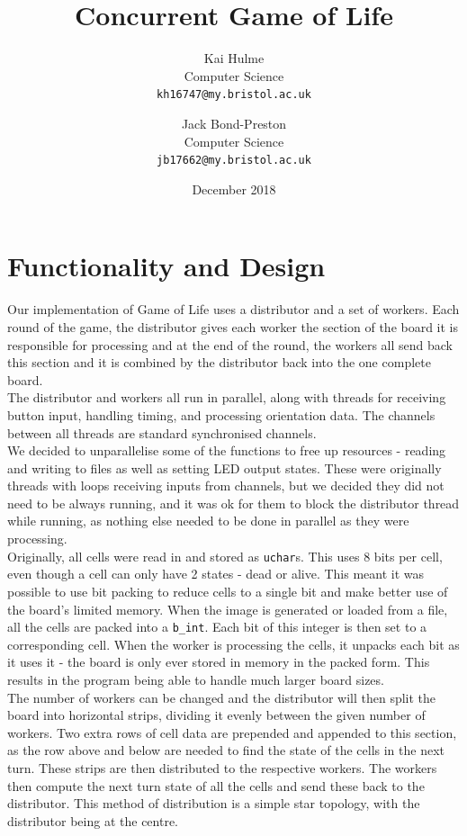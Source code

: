 \documentclass[]{article}
\title{Concurrent Game of Life}
\author{
	Kai Hulme\\
	Computer Science\\
	\texttt{kh16747@my.bristol.ac.uk}
	\and
	Jack Bond-Preston\\
	Computer Science\\
	\texttt{jb17662@my.bristol.ac.uk}
}
\date{December 2018}
\begin{document}
\maketitle
\clearpage

\section{Functionality and Design}
Our implementation of Game of Life uses a distributor and a set of workers. Each round of the game, the distributor gives each worker the section of the board it is responsible for processing and at the end of the round, the workers all send back this section and it is combined by the distributor back into the one complete board.\\

The distributor and workers all run in parallel, along with threads for receiving button input, handling timing, and processing orientation data. The channels between all threads are standard synchronised channels.\\

We decided to unparallelise some of the functions to free up resources - reading and writing to files as well as setting LED output states. These were originally threads with loops receiving inputs from channels, but we decided they did not need to be always running, and it was ok for them to block the distributor thread while running, as nothing else needed to be done in parallel as they were processing.\\

Originally, all cells were read in and stored as \lstinline{uchar}s. This uses 8 bits per cell, even though a cell can only have 2 states - dead or alive. This meant it was possible to use bit packing to reduce cells to a single bit and make better use of the board's limited memory. When the image is generated or loaded from a file, all the cells are packed into a \lstinline{b_int}. Each bit of this integer is then set to a corresponding cell. When the worker is processing the cells, it unpacks each bit as it uses it - the board is only ever stored in memory in the packed form. This results in the program being able to handle much larger board sizes.\\

The number of workers can be changed and the distributor will then split the board into horizontal strips, dividing it evenly between the given number of workers. Two extra rows of cell data are prepended and appended to this section, as the row above and below are needed to find the state of the cells in the next turn. These strips are then distributed to the respective workers. The workers then compute the next turn state of all the cells and send these back to the distributor. This method of distribution is a simple star topology, with the distributor being at the centre.\\
\end{document}
